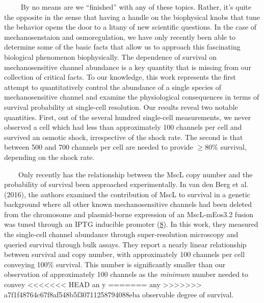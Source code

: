 ~~~~
By no
means
are we
``finished''
with
any of
these
topics.
Rather,
it's
quite
the
opposite
in the
sense
that
having
a
handle
on the
biophysical
knobs
that
tune
the
behavior
opens
the
door
to a
litany
of new
scientific
questions.
In the
case
of
mechanosenstaion
and
osmoregulation,
we
have
only
recently
been
able
to
determine
some
of the
basic
facts
that
allow
us to
approach
this
fascinating
biological
phenomenon
biophysically.
The
dependence
of
survival
on
mechanosensitive
channel
abundance
is a
key
quantity
that
is
missing
from
our
collection
of
critical
facts.
To our
knowledge,
this
work
represents
the
first
attempt
to
quantitatively
control
the
abundance
of a
single
species
of
mechanosensitive
channel
and
examine
the
physiological
consequences
in
terms
of
survival
probability
at
single-cell
resolution.
Our
results
reveal
two
notable
quantities.
First,
out of
the
several
hundred
single-cell
measurements,
we
never
observed
a cell
which
had
less
than
approximately
100
channels
per
cell
and
survived
an
osmotic
shock,
irrespective
of the
shock
rate.
The
second
is
that
between
500
and
700
channels
per
cell
are
needed
to
provide
\(\geq 80\%\)
survival,
depending
on the
shock
rate.

~~~~Only
recently
has
the
relationship
between
the
MscL
copy
number
and
the
probability
of
survival
been
approached
experimentally.
In van
den
Berg
et al.
(2016),
the
authors
examined
the
contribution
of
MscL
to
survival
in a
genetic
background
where
all
other
known
mechanosensitive
channels
had
been
deleted
from
the
chromosome
and
plasmid-borne
expression
of an
MscL-mEos3.2
fusion
was
tuned
through
an
IPTG
inducible
promoter
(\protect\hyperlink{ref-vandenberg2016}{8}).
In
this
work,
they
measured
the
single-cell
channel
abundance
through
super-resolution
microscopy
and
queried
survival
through
bulk
assays.
They
report
a
nearly
linear
relationship
between
survival
and
copy
number,
with
approximately
100
channels
per
cell
conveying
100\%
survival.
This
number
is
significantly
smaller
than
our
observation
of
approximately
100
channels
as the
\emph{minimum}
number
needed
to
convey
<<<<<<< HEAD
an y
=======
any
>>>>>>> a7f1f48764c67f8af548b5f30711258794088eba
observable
degree
of
survival.

